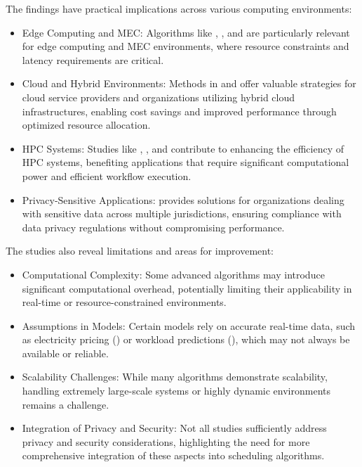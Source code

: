\documentclass[a4paper, final]{article}
\begin{document}
\noindent The findings have practical implications across various computing environments:
\begin{itemize}
    \item Edge Computing and MEC: Algorithms like \cite{bib:2_faro}, \cite{bib:3_sandcat}, and \cite{bib:6_marine} are particularly 
    relevant for edge computing and MEC environments, where resource constraints and latency requirements are critical.

    \item Cloud and Hybrid Environments: Methods in \cite{bib:5_epee} and \cite{bib:9} offer valuable strategies for cloud 
    service providers and organizations utilizing hybrid cloud infrastructures, enabling cost savings and 
    improved performance through optimized resource allocation.
    
    \item HPC Systems: Studies like \cite{bib:1_acrl}, \cite{bib:8}, and \cite{bib:10} contribute to enhancing the 
    efficiency of HPC systems, benefiting applications that require significant computational power and efficient workflow execution.
    
    \item Privacy-Sensitive Applications: \cite{bib:7_ppps} provides solutions for organizations dealing with sensitive 
    data across multiple jurisdictions, ensuring compliance with data privacy regulations without compromising performance.
\end{itemize}

\noindent The studies also reveal limitations and areas for improvement:
\begin{itemize}
    \item Computational Complexity: Some advanced algorithms may introduce significant computational 
    overhead, potentially limiting their applicability in real-time or resource-constrained environments.

    \item Assumptions in Models: Certain models rely on accurate real-time data, such as electricity pricing 
    (\cite{bib:5_epee}) or workload predictions (\cite{bib:6_marine}), which may not always be available or reliable.
    
    \item Scalability Challenges: While many algorithms demonstrate scalability, handling extremely large-scale 
    systems or highly dynamic environments remains a challenge.
    
    \item Integration of Privacy and Security: Not all studies sufficiently address privacy and security 
    considerations, highlighting the need for more comprehensive integration of these aspects into scheduling algorithms.
\end{itemize}
\end{document}
